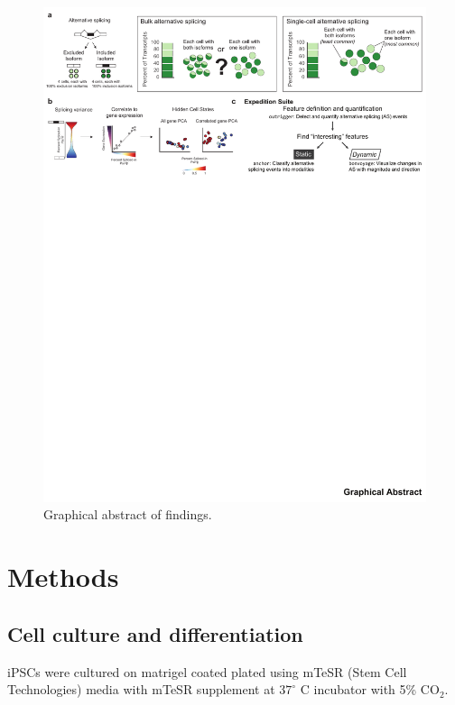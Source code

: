 \begin{figure}[h]
  \centering
  \includegraphics[width=5.8in]{figures/graphical_abstract.pdf}
  \caption{Graphical abstract of findings.}
  \label{fig:graphical_abstract}
\end{figure}

\section{Methods}



\subsection{Cell culture and differentiation}

iPSCs were cultured on matrigel coated plated using mTeSR (Stem Cell Technologies) media with mTeSR supplement at $37^\circ$ C incubator with 5\% CO$_{2}$.\par

